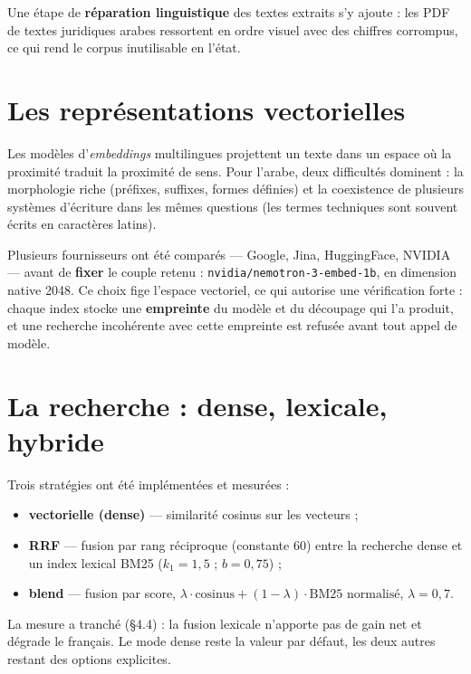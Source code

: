 \documentclass[a4paper,12pt]{report}
\begin{document}
Une étape de \textbf{réparation linguistique} des textes extraits s'y ajoute : les PDF de textes
juridiques arabes ressortent en ordre visuel avec des chiffres corrompus, ce qui rend le corpus
inutilisable en l'état.

\section{Les représentations vectorielles}
Les modèles d'\emph{embeddings} multilingues projettent un texte dans un espace où la proximité
traduit la proximité de sens. Pour l'arabe, deux difficultés dominent : la morphologie riche
(préfixes, suffixes, formes définies) et la coexistence de plusieurs systèmes d'écriture dans les
mêmes questions (les termes techniques sont souvent écrits en caractères latins).

Plusieurs fournisseurs ont été comparés — Google, Jina, HuggingFace, NVIDIA — avant de
\textbf{fixer} le couple retenu : \texttt{nvidia/nemotron-3-embed-1b}, en dimension native 2048.
Ce choix fige l'espace vectoriel, ce qui autorise une vérification forte : chaque index stocke une
\textbf{empreinte} du modèle et du découpage qui l'a produit, et une recherche incohérente avec
cette empreinte est refusée avant tout appel de modèle.

\section{La recherche : dense, lexicale, hybride}
Trois stratégies ont été implémentées et mesurées :
\begin{itemize}
  \item \textbf{vectorielle (dense)} — similarité cosinus sur les vecteurs ;
  \item \textbf{RRF} — fusion par rang réciproque (constante 60) entre la recherche dense et un
        index lexical BM25 ($k_1 = 1{,}5$ ; $b = 0{,}75$) ;
  \item \textbf{blend} — fusion par score, $\lambda \cdot \text{cosinus} + (1-\lambda) \cdot
        \text{BM25 normalisé}$, $\lambda = 0{,}7$.
\end{itemize}
La mesure a tranché (§4.4) : la fusion lexicale n'apporte pas de gain net et dégrade le français.
Le mode dense reste la valeur par défaut, les deux autres restant des options explicites.
\end{document}

